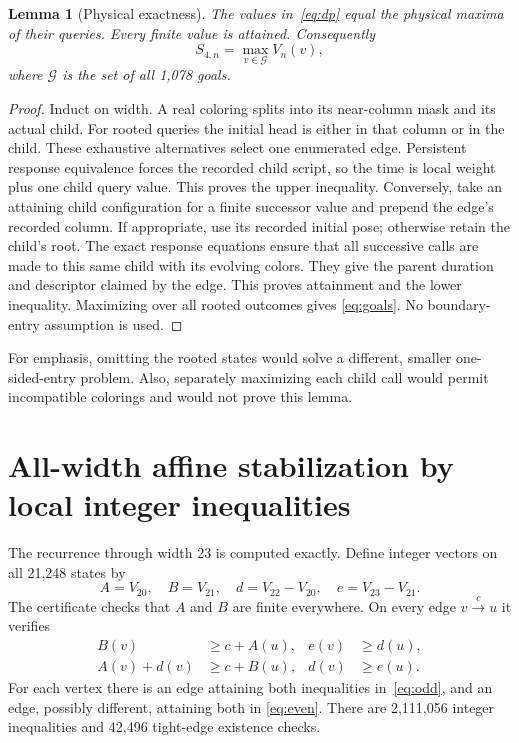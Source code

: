 \documentclass[11pt]{article}
\newtheorem{lemma}[theorem]{Lemma}
\theoremstyle{definition}\newtheorem{definition}[theorem]{Definition}
\begin{document}
\begin{lemma}[Physical exactness]\label{lem:exact}
The values in~\eqref{eq:dp} equal the physical maxima of their queries. Every
finite value is attained. Consequently
\begin{equation}\label{eq:goals}
 S_{4,n}=\max_{v\in\mathcal G}V_n(v),
\end{equation}
where $\mathcal G$ is the set of all 1,078 goals.
\end{lemma}
\begin{proof}
Induct on width. A real coloring splits into its near-column mask and its actual
child. For rooted queries the initial head is either in that column or in the
child. These exhaustive alternatives select one enumerated edge. Persistent
response equivalence forces the recorded child script, so the time is local
weight plus one child query value. This proves the upper inequality.
Conversely, take an attaining child configuration for a finite successor value
and prepend the edge's recorded column. If appropriate, use its recorded initial
pose; otherwise retain the child's root. The exact response equations ensure
that all successive calls are made to this same child with its evolving colors.
They give the parent duration and descriptor claimed by the edge. This proves
attainment and the lower inequality. Maximizing over all rooted outcomes gives
\eqref{eq:goals}. No boundary-entry assumption is used.
\end{proof}

For emphasis, omitting the rooted states would solve a different, smaller
one-sided-entry problem. Also, separately maximizing each child call would
permit incompatible colorings and would not prove this lemma.

\section{All-width affine stabilization by local integer inequalities}
The recurrence through width 23 is computed exactly. Define integer vectors
on all 21,248 states by
\[
 A=V_{20},\quad B=V_{21},\quad d=V_{22}-V_{20},\quad e=V_{23}-V_{21}.
\]
The certificate checks that $A$ and $B$ are finite everywhere. On every edge
$v\xrightarrow{c}u$ it verifies
\begin{align}
 B(v)&\ge c+A(u),& e(v)&\ge d(u),\label{eq:odd}\\[2pt]
 A(v)+d(v)&\ge c+B(u),& d(v)&\ge e(u).\label{eq:even}
\end{align}
For each vertex there is an edge attaining both inequalities
in~\eqref{eq:odd}, and an edge, possibly different, attaining both in
\eqref{eq:even}. There are 2,111,056 integer inequalities and 42,496 tight-edge
existence checks.
\end{document}

